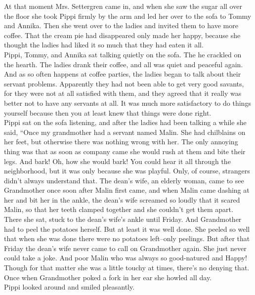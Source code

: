 \documentclass{standard}
\begin{document}
At that moment Mrs. Settergren came in, and when she saw the sugar all over the floor she took Pippi firmly by the arm and led her over to the sofa to Tommy and Annika. Then she went over to the ladies and invited them to have more coffee. That the cream pie had disappeared only made her happy, because she thought the ladies had liked it so much that they had eaten it all.\\

Pippi, Tommy, and Annika sat talking quietly on the sofa. The he crackled on the hearth. The ladies drank their coffee, and all was quiet and peaceful again. And as so often happens at coffee parties, the ladies began to talk about their servant problems. Apparently they had not been able to get very good savants, for they were not at all satisfied with them, and they agreed that it really was better not to have any servants at all. It was much more satisfactory to do things yourself because then you at least knew that things were done right.\\

Pippi sat on the sofa listening, and after the ladies had been talking a while she said, “Once my grandmother had a servant named Malin. She had chilblains on her feet, but otherwise there was nothing wrong with her. The only annoying thing was that as soon as company came she would rush at them and bite their legs. And bark! Oh, how she would bark! You could hear it all through the neighborhood, but it was only because she was playful. Only, of course, strangers didn’t always understand that. The dean’s wife, an elderly woman, came to see Grandmother once soon after Malin first came, and when Malin came dashing at her and bit her in the ankle, the dean’s wife screamed so loudly that it scared Malin, so that her teeth clamped together and she couldn’t get them apart. There she sat, stuck to the dean’s wife’s ankle until Friday. And Grandmother had to peel the potatoes herself. But at least it was well done. She peeled so well that when she was done there were no potatoes left--only peelings. But after that Friday the dean’s wife never came to call on Grandmother again. She just never could take a joke. And poor Malin who was always so good-natured and Happy! Though for that matter she was a little touchy at times, there’s no denying that. Once when Grandmother poked a fork in her ear she howled all day.\\

Pippi looked around and smiled pleasantly.\\
\end{document}
